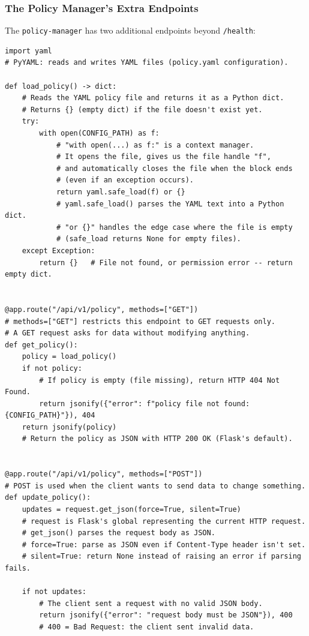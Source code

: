 \documentclass[12pt, a4paper]{article}
\begin{document}
\subsubsection{The Policy Manager's Extra Endpoints}

The \texttt{policy-manager} has two additional endpoints beyond \texttt{/health}:

\begin{lstlisting}[style=python, caption={services/policy-manager/app.py --- policy REST API}]
import yaml
# PyYAML: reads and writes YAML files (policy.yaml configuration).

def load_policy() -> dict:
    # Reads the YAML policy file and returns it as a Python dict.
    # Returns {} (empty dict) if the file doesn't exist yet.
    try:
        with open(CONFIG_PATH) as f:
            # "with open(...) as f:" is a context manager.
            # It opens the file, gives us the file handle "f",
            # and automatically closes the file when the block ends
            # (even if an exception occurs).
            return yaml.safe_load(f) or {}
            # yaml.safe_load() parses the YAML text into a Python dict.
            # "or {}" handles the edge case where the file is empty
            # (safe_load returns None for empty files).
    except Exception:
        return {}   # File not found, or permission error -- return empty dict.


@app.route("/api/v1/policy", methods=["GET"])
# methods=["GET"] restricts this endpoint to GET requests only.
# A GET request asks for data without modifying anything.
def get_policy():
    policy = load_policy()
    if not policy:
        # If policy is empty (file missing), return HTTP 404 Not Found.
        return jsonify({"error": f"policy file not found: {CONFIG_PATH}"}), 404
    return jsonify(policy)
    # Return the policy as JSON with HTTP 200 OK (Flask's default).


@app.route("/api/v1/policy", methods=["POST"])
# POST is used when the client wants to send data to change something.
def update_policy():
    updates = request.get_json(force=True, silent=True)
    # request is Flask's global representing the current HTTP request.
    # get_json() parses the request body as JSON.
    # force=True: parse as JSON even if Content-Type header isn't set.
    # silent=True: return None instead of raising an error if parsing fails.

    if not updates:
        # The client sent a request with no valid JSON body.
        return jsonify({"error": "request body must be JSON"}), 400
        # 400 = Bad Request: the client sent invalid data.


\end{lstlisting}
\end{document}

